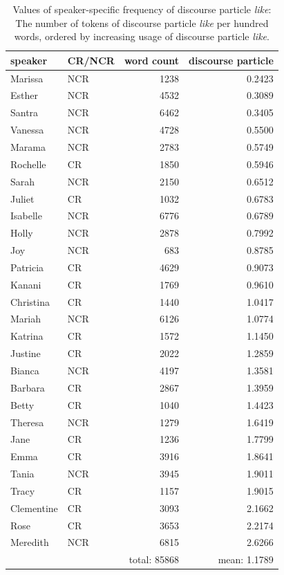 \begin{table}[htbp]
\caption{Values of speaker-specific frequency of discourse particle \textit{like}: The number of tokens of discourse particle \textit{like} per hundred words, ordered by increasing usage of discourse particle \textit{like}.}
  \label{tab:percentdp}
	 \begin{center}
		\begin{tabular}{llrr}\hline
	
speaker & CR/NCR & word count & discourse particle\\
  \hline

Marissa	 & NCR &	1238	& 0.2423 \\
Esther	& NCR	& 4532	& 0.3089 \\
Santra	& NCR	& 6462 &	0.3405 \\
Vanessa	& NCR	& 4728	& 0.5500 \\
Marama &	NCR &	2783 &	0.5749 \\
Rochelle	& CR	& 1850	& 0.5946 \\
Sarah	& NCR	& 2150	& 0.6512 \\
Juliet &	CR &	1032 &	0.6783 \\
Isabelle	& NCR	& 6776 &	0.6789 \\
Holly	& NCR	& 2878 &	0.7992 \\
Joy	& NCR	& 683	& 0.8785 \\
Patricia	& CR	& 4629 &	0.9073 \\
Kanani	& CR	& 1769	& 0.9610 \\
Christina	& CR &	1440	& 1.0417 \\
Mariah	& NCR	& 6126 &	1.0774 \\
Katrina	& CR &	1572 &	1.1450 \\
Justine	& CR &	2022 &	1.2859 \\
Bianca	& NCR	& 4197	& 1.3581 \\
Barbara	& CR	& 2867	& 1.3959 \\
Betty	& CR	& 1040	& 1.4423 \\
Theresa	& NCR	& 1279 &	1.6419 \\
Jane	& CR	& 1236	& 1.7799 \\
Emma	& CR &	3916 &	1.8641\\
Tania	& NCR &	3945 &	1.9011 \\
Tracy	& CR &	1157 &	1.9015\\
Clementine	& CR	& 3093	& 2.1662 \\
Rose &	CR	& 3653 &	2.2174 \\
Meredith	& NCR	& 6815	& 2.6266 \\
&& total: 85868 & mean: 1.1789 \\

\hline
		\end{tabular}
	
	\end{center}
\end{table} 

